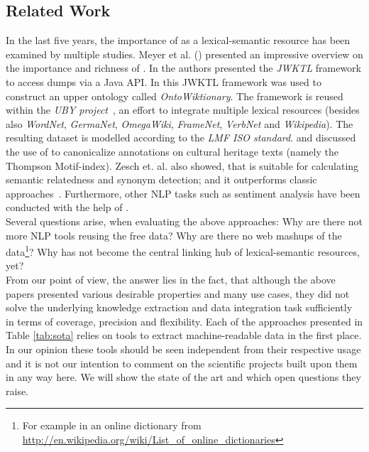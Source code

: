 \subsection{Related Work}\label{relatedWork}
In the last five years, the importance of \wik as a lexical-semantic resource has been examined by multiple studies.
Meyer et al. (\cite{Meyer_2010a,Meyer_2010b}) presented an impressive overview on the importance and richness of \wik. 
In \cite{Zesch_2008_jwktl} the authors presented the \emph{JWKTL} framework to access \wik dumps via a Java API.
In \cite{meyer_2011b} this JWKTL framework was used to construct an upper ontology called \emph{OntoWiktionary}.
The framework is reused within the \emph{UBY project}~\cite{Gurevych_2012}, an effort to integrate multiple lexical resources (besides \wik also \emph{WordNet}, \emph{GermaNet}, \emph{OmegaWiki}, \emph{FrameNet}, \emph{VerbNet} and \emph{Wikipedia}).
The resulting dataset is modelled according to the \emph{LMF ISO standard}\cite{iso_24613-2008}.
\cite{Moerth_2011} and \cite{Declerck-2012} discussed the use of \wik to canonicalize annotations on cultural heritage texts (namely the Thompson Motif-index). 
Zesch et. al. also showed, that \wik is suitable for calculating semantic relatedness and synonym detection; and it outperforms classic approaches~\cite{Zesch_2008,Weale_2009}. 
Furthermore, other NLP tasks such as sentiment analysis have been conducted with the help of \wik \cite{Chesley_2006}.\\
Several questions arise, when evaluating the above approaches:
Why are there not more NLP tools reusing the free \wik data?
Why are there no web mashups of the data\footnote{For example in an online dictionary from \url{http://en.wikipedia.org/wiki/List_of_online_dictionaries}}?
Why has \wik not become the central linking hub of lexical-semantic resources, yet?\\
From our point of view, the answer lies in the fact, that although the above papers presented various desirable properties and many use cases, they did not solve the underlying knowledge extraction and data integration task sufficiently in terms of coverage, precision and flexibility.
Each of the approaches presented in Table \ref{tab:sota} relies on tools to extract machine-readable data in the first place.
In our opinion these tools should  be seen independent from their respective usage and it is not our intention to comment on the scientific projects built upon them in any way here. 
We will show the state of the art and which open questions they raise. 

